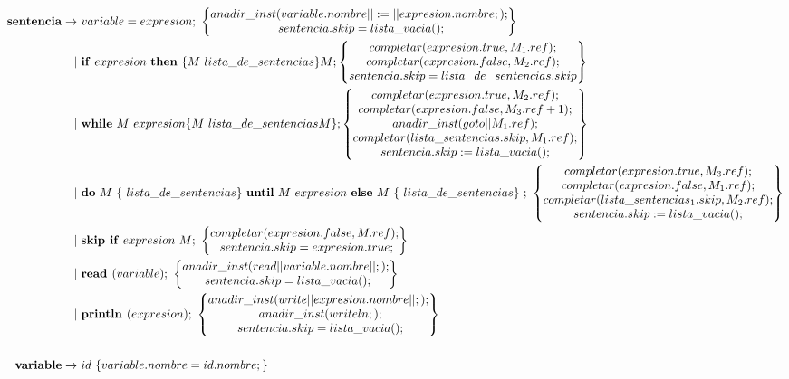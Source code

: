\documentclass[12pt,a4paper,landscape]{article}
\theoremstyle{mytheor}
\begin{document}
\begin{alignat*}{2}
  \text{\textbf{sentencia}} \to\ & variable = expresion;\ \begin{Bmatrix} anadir\_inst(variable.nombre||:=||expresion.nombre;);\\ sentencia.skip=lista\_vacia();\end{Bmatrix}\\
 |\ &\text{\textbf{if}}\ expresion\ \text{\textbf{then}}\ \{M\ lista\_de\_sentencias\}M; \begin{Bmatrix} completar(expresion.true,M_1.ref); \\ completar(expresion.false,M_2.ref);\\ sentencia.skip=lista\_de\_sentencias.skip \end{Bmatrix} \\
 |\ &\text{\textbf{while}}\ M\ expresion \{M\ lista\_de\_sentencias M\}; \begin{Bmatrix} completar(expresion.true,M_2.ref); \\ completar(expresion.false,M_3.ref+1);\\ anadir\_inst(goto||M_1.ref);\\completar(lista\_sentencias.skip,M_1.ref);\\sentencia.skip:=lista\_vacia(); \end{Bmatrix} \\
 |\ &\text{\textbf{do}}\ M\ \{\ lista\_de\_sentencias \}\ \text{\textbf{until}}\ M\ expresion\ \text{\textbf{else}}\ M\ \{\ lista\_de\_sentencias\}\ ;\ \begin{Bmatrix} completar(expresion.true,M_3.ref); \\ completar(expresion.false,M_1.ref);\\ completar(lista\_sentencias_1.skip,M_2.ref);\\sentencia.skip:=lista\_vacia(); \end{Bmatrix} \\
 |\ &\text{\textbf{skip if}}\ expresion\ M;\ \begin{Bmatrix} completar(expresion.false,M.ref); \\ sentencia.skip =expresion.true; \end{Bmatrix}\\
 |\ &\text{\textbf{read }}(variable);\ \begin{Bmatrix} anadir\_inst(read||variable.nombre||;);\\ sentencia.skip=lista\_vacia();\end{Bmatrix}\\
 |\ &\text{\textbf{println }}(expresion);\  \begin{Bmatrix} anadir\_inst(write||expresion.nombre||;); \\ anadir\_inst(writeln;); \\ sentencia.skip=lista\_vacia(); \end{Bmatrix}\\\\
 \text{\textbf{variable}} \to\ & id\ \{variable.nombre = id.nombre;\}
\end{alignat*}
\end{document}
